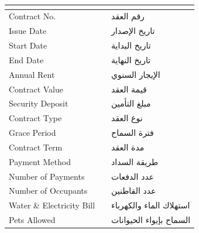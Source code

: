 \documentclass[10pt,a4paper]{article}
\begin{document}
\begin{center}
  \Large\textbf{\color{TealHeader}{عقد إيـجـار}} \\
  \large\textbf{\color{TealHeader}{Tenancy Contract}}
\end{center}

\vspace{10pt}

\renewcommand{\arraystretch}{1.3}
\begin{tabular}{| L{4.5cm} | L{10.0cm} | R{4.5cm} |}
  \hline
  \textbf{\color{white}{CONTRACT DETAILS}} & & \textbf{\color{white}{تفاصيل العقد}} \\
  \hline
  Contract No. & \color{BlueValue}{202401457543} & رقم العقد \\
  \hline
  Issue Date & \color{BlueValue}{2025-07-03} & تاريخ الإصدار \\
  \hline
  Start Date & \color{BlueValue}{2025-08-12} & تاريخ البداية \\
  \hline
  End Date & \color{BlueValue}{2026-08-14} & تاريخ النهاية \\
  \hline
  Annual Rent & \color{BlueValue}{58,000.00} & الإيجار السنوي \\
  \hline
  Contract Value & \color{BlueValue}{58,000.00} & قيمة العقد \\
  \hline
  Security Deposit & \color{BlueValue}{---} & مبلغ التأمين \\
  \hline
  Contract Type & \color{BlueValue}{Residential} & نوع العقد \\
  \hline
  Grace Period & \color{BlueValue}{---} & فترة السماح \\
  \hline
  Contract Term & \color{BlueValue}{1 Year} & مدة العقد \\
  \hline
  Payment Method & \color{BlueValue}{Cheque} & طريقة السداد \\
  \hline
  Number of Payments & \color{BlueValue}{1} & عدد الدفعات \\
  \hline
  Number of Occupants & \color{BlueValue}{1} & عدد القاطنين \\
  \hline
  Water \& Electricity Bill & \color{BlueValue}{TENANT} & استهلاك الماء والكهرباء \\
  \hline
  Pets Allowed & \color{BlueValue}{No} & السماح بإيواء الحيوانات \\
  \hline
\end{tabular}
\end{document}
